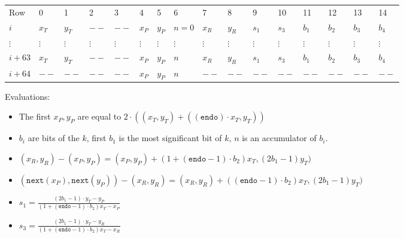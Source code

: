 \begin{center}
    \begin{table}[H]
        \begin{tabular}{llllllllllllllll}
            Row    & 0        & 1        & 2        & 3        & 4        & 5        & 6        & 7        & 8        & 9        & 10       & 11       & 12       & 13       & 14       \\
            $i$   & $x_T$    & $y_T$    & $--$    & $--$    & $x_P$    & $y_P$    & $n = 0$      & $x_R$    & $y_R$    & $s_1$    & $s_3$    & $b_1$    & $b_2$ & $b_3$ & $b_4$ \\
            $\vdots$ & $\vdots$ & $\vdots$ & $\vdots$ & $\vdots$ & $\vdots$ & $\vdots$ & $\vdots$ & $\vdots$ & $\vdots$ & $\vdots$ & $\vdots$ & $\vdots$ & $\vdots$ & $\vdots$ & $\vdots$ \\
            $i + 63$ &  $x_T$    & $y_T$    & $--$    & $--$    & $x_P$    & $y_P$    & $n$      & $x_R$    & $y_R$    & $s_1$    & $s_3$    & $b_1$    & $b_2$ & $b_3$ & $b_4$ \\
            $i + 64$ &  $--$    & $--$    & $--$    & $--$    & $x_P$    & $y_P$    & $n$      & $--$    & $--$    & $--$    & $--$    & $--$    & $--$ & $--$ & $--$ \\
        \end{tabular}
    \end{table}
\end{center}

Evaluations:
\begin{itemize}
	\item The first $x_P, y_P$ are equal to $2 \cdot ((x_T, y_T) + ((\texttt{endo}) \cdot x_T, y_T))$
	\item $b_i$ are bits of the $k$, first $b_1$ is the most significant bit of $k$, $n$ is an accumulator of $b_i$.
	\item $(x_R, y_R) - (x_P, y_P) = (x_P, y_P) + (1 + (\texttt{endo} - 1) \cdot b_2) x_T, (2b_1 - 1)y_T)$
	\item $(\texttt{next}(x_P), \texttt{next}(y_P)) - (x_R, y_R) = (x_R, y_R) + ((\texttt{endo} - 1) \cdot b_2) x_T, (2b_1 - 1)y_T)$
	\item $s_1 = \frac{(2b_1 - 1) \cdot y_T - y_P}{(1 + (\texttt{endo} - 1) \cdot b_2) x_T - x_P}$
	\item $s_3 = \frac{(2b_1 - 1) \cdot y_T - y_R}{(1 + (\texttt{endo} - 1) \cdot b_2) x_T - x_R}$

\end{itemize}

